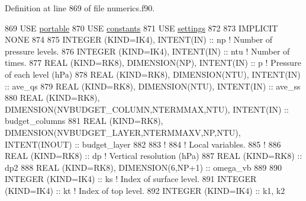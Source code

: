 Definition at line 869 of file numerics.\+f90.


\begin{DoxyCode}
869 \textcolor{keywordtype}{USE }\hyperlink{namespaceportable}{portable}
870 \textcolor{keywordtype}{USE }\hyperlink{namespaceconstants}{constants}
871 \textcolor{keywordtype}{USE }\hyperlink{namespacesettings}{settings}
872 
873 \textcolor{keywordtype}{IMPLICIT NONE}
874 
875 \textcolor{keywordtype}{INTEGER (KIND=IK4)}, \textcolor{keywordtype}{INTENT(IN)}                                              :: np               \textcolor{comment}{! Number of
       pressure levels.}
876 \textcolor{keywordtype}{INTEGER (KIND=IK4)}, \textcolor{keywordtype}{INTENT(IN)}                                              :: ntu              \textcolor{comment}{! Number of
       times.}
877 \textcolor{keywordtype}{REAL (KIND=RK8)}, \textcolor{keywordtype}{DIMENSION(NP)}, \textcolor{keywordtype}{INTENT(IN)}                                  :: p                \textcolor{comment}{! Pressure
       of each level (hPa)}
878 \textcolor{keywordtype}{REAL (KIND=RK8)}, \textcolor{keywordtype}{DIMENSION(NTU)}, \textcolor{keywordtype}{INTENT(IN)}                                 :: ave\_qs
879 \textcolor{keywordtype}{REAL (KIND=RK8)}, \textcolor{keywordtype}{DIMENSION(NTU)}, \textcolor{keywordtype}{INTENT(IN)}                                 :: ave\_ss
880 \textcolor{keywordtype}{REAL (KIND=RK8)}, \textcolor{keywordtype}{DIMENSION(NVBUDGET\_COLUMN,NTERMMAX,NTU)}, \textcolor{keywordtype}{INTENT(IN)}        :: budget\_columns
881 \textcolor{keywordtype}{REAL (KIND=RK8)}, \textcolor{keywordtype}{DIMENSION(NVBUDGET\_LAYER,NTERMMAXV,NP,NTU)}, \textcolor{keywordtype}{INTENT(INOUT)}  :: budget\_layer
882 
883 \textcolor{comment}{!}
884 \textcolor{comment}{! Local variables.}
885 \textcolor{comment}{!}
886 \textcolor{keywordtype}{REAL (KIND=RK8)}                                                     :: dp               \textcolor{comment}{! Vertical
       resolution (hPa)}
887 \textcolor{keywordtype}{REAL (KIND=RK8)}                                                     :: dp2
888 \textcolor{keywordtype}{REAL (KIND=RK8)}, \textcolor{keywordtype}{DIMENSION(6,NP+1)}                                  :: omega\_vb
889 
890 \textcolor{keywordtype}{INTEGER (KIND=IK4)}                                                  :: ks               \textcolor{comment}{! Index of surface
       level.}
891 \textcolor{keywordtype}{INTEGER (KIND=IK4)}                                                  :: kt               \textcolor{comment}{! Index of top
       level.}
892 \textcolor{keywordtype}{INTEGER (KIND=IK4)}                                                  :: k1, k2

\end{DoxyCode}

